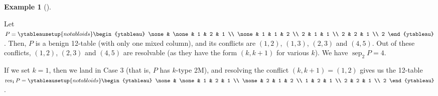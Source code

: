 \documentclass[numbers=enddot,12pt,final,onecolumn,notitlepage]{scrartcl}%
\theoremstyle{definition}
\newtheorem{exmp}[theo]{Example}
\newenvironment{example}[1][]
{\begin{exmp}[#1]\begin{leftbar}}
{\end{leftbar}\end{exmp}}
\newenvironment{verlong}{}{}
\begin{document}
\begin{verlong}

\begin{example}
\label{exa.resolve}Let $P=%
\ytableausetup{notabloids}
\begin{ytableau}
\none& \none& 1 & 2 & 1 \\
\none& 1 & 1 & 2 \\
2 & 1 & 1 \\
2 & 2 & 1 \\
2
\end{ytableau}%
$. Then, $P$ is a benign 12-table (with only one mixed column), and its
conflicts are $\left(  1,2\right)  $, $\left(  1,3\right)  $, $\left(
2,3\right)  $ and $\left(  4,5\right)  $. Out of these conflicts, $\left(
1,2\right)  $, $\left(  2,3\right)  $ and $\left(  4,5\right)  $ are
resolvable (as they have the form $\left(  k,k+1\right)  $ for various $k$).
We have $\operatorname*{sep}\nolimits_{2}P=4$.

If we set $k=1$, then we land in Case 3 (that is, $P$ has $k$-type 2M), and
resolving the conflict $\left(  k,k+1\right)  =\left(  1,2\right)  $ gives us
the 12-table $\operatorname*{res}\nolimits_{1}P=%
\ytableausetup{notabloids}
\begin{ytableau}
\none& \none& 1 & 2 & 1 \\
\none& 2 & 1 & 2 \\
1 & 2 & 1 \\
2 & 2 & 1 \\
2
\end{ytableau}%
$.


\end{example}
\end{verlong}
\end{document}
